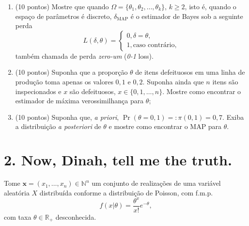 \documentclass[a4paper,10pt, notitlepage]{report}
\newcommand{\pr}{\operatorname{Pr}} %
\newcommand{\bx}{\boldsymbol{x}} %
\newif\ifanswers
\begin{document}
\begin{enumerate}[label=\alph*)]
 \item (10 pontos) Mostre que quando $\Omega = \{\theta_1, \theta_2, \ldots, \theta_k\}$, $k\geq2$, isto é, quando o espaço de parâmetros é discreto, $\delta_{\text{MAP}}$ é o estimador de Bayes sob  a seguinte perda
 \begin{equation*}
     L(\delta, \theta) = 
     \begin{cases}
     0, \delta = \theta,\\
     1, \text{caso contrário},
     \end{cases}
  \end{equation*}
  também chamada de perda \textit{zero-um} (\textit{0-1} loss).    
 \item (10 pontos) Suponha que a proporção $\theta$ de itens defeituosos em uma linha de produção toma apenas os valores $0,1$ e $0,2$.
 Suponha ainda que $n$ itens são inspecionados  e $x$ são defeituosos, $x \in \{0, 1, \ldots, n\}$.
 Mostre como encontrar o estimador de máxima verossimilhança para $\theta$;
 \item (10 pontos) Suponha que, \textit{a priori}, $\pr(\theta = 0,1) =: \pi(0,1) = 0,7$. 
 Exiba a distribuição \textit{a posteriori} de $\theta$ e mostre como encontrar o MAP para $\theta$.
 \end{enumerate}
\ifanswers

\fi

\section*{2. Now, Dinah, tell me the truth.} 

Tome $\bx = (x_{1}, \dots, x_{n}) \in \mathbb{N}^{n}$ um conjunto de realizações de uma variável aleatória $X$ distribuída conforme a distribuição de Poisson, com f.m.p.
\begin{equation*} 
	f(x | \theta) = \frac{\theta^{x}}{x!} e^{-\theta}, 
\end{equation*} 
\noindent com taxa $\theta \in \mathbb{R}_{+}$ desconhecida. 
\end{document}
